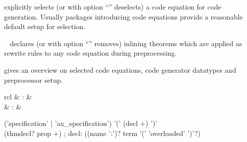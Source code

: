 \begin{isabellebody}
\begin{isamarkuptext}
\begin{description}
  \item \hyperlink{attribute.HOL.code}{\mbox{}} explicitly selects (or with option
  ``'' deselects) a code equation for code
  generation.  Usually packages introducing code equations provide
  a reasonable default setup for selection.

  \item \hyperlink{attribute.HOL.code}{\mbox{}}~ declares (or with
  option ``'' removes) inlining theorems which are
  applied as rewrite rules to any code equation during
  preprocessing.

  \item \hyperlink{command.HOL.print-codesetup}{\mbox{}} gives an overview on
  selected code equations, code generator datatypes and
  preprocessor setup.

  \end{description}%
\end{isamarkuptext}%
\isamarkuptrue%
%
\isamarkuptrue%
%
\begin{isamarkuptext}%
\begin{matharray}{rcl}
    \hypertarget{command.HOL.specification}{\hyperlink{command.HOL.specification}{\mbox{}}} & : &  \\
    \hypertarget{command.HOL.ax-specification}{\hyperlink{command.HOL.ax-specification}{\mbox{}}} & : &  \\
  \end{matharray}

  \begin{rail}
  ('specification' | 'ax\_specification') '(' (decl +) ')' \\ (thmdecl? prop +)
  ;
  decl: ((name ':')? term '(' 'overloaded' ')'?)
  \end{rail}

  \begin{description}


\end{description}
\end{isamarkuptext}
\end{isabellebody}
